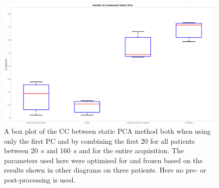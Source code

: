             \begin{figure}
                \centering
                
                \includegraphics[width=1.0\linewidth]{figures/data_driven_surrogate_signal_extraction_results_1_box_plot.png}
                
                \captionsetup{singlelinecheck=false, justification=centering}
                \caption{A box plot of the \gls{CC} between static \gls{PCA} method both when using only the first \gls{PC} and by combining the first $20$  for all patients between \SI{20}{\second} and \SI{160}{\second} and for the entire acquisition. The parameters used here were optimised for and frozen based on the results shown in other diagrams on three patients. Here no pre- or post-processing is used.}
                \label{fig:pca_data_driven_surrogate_signal_extraction_methods_for_dynamic_pet_results_box_plot}
            \end{figure}
            
